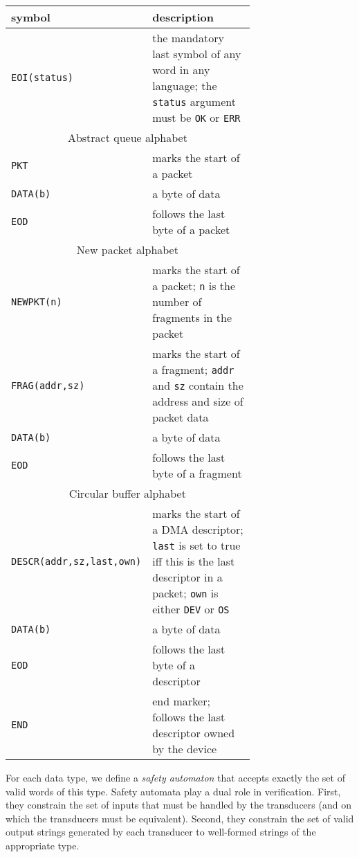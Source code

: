 \documentclass{article}
\begin{document}
\begin{table}
    \small
    \begin{tabular}{|l|p{0.7\linewidth}|}
        \hline
        symbol & description \\
        \hline\hline
        \texttt{EOI(status)}   & the mandatory last symbol of any word in any language; the
                                 \texttt{status} argument must be 
                                 \texttt{OK} or \texttt{ERR} \\
        \hline
        \multicolumn{2}{|c|}{Abstract queue alphabet}\\
        \hline
        \texttt{PKT}           & marks the start of a packet\\
        \texttt{DATA(b)}       & a byte of data\\
        \texttt{EOD}           & follows the last byte of a packet\\
        \hline
        \multicolumn{2}{|c|}{New packet alphabet}\\
        \hline
        \texttt{NEWPKT(n)}     & marks the start of a packet; \texttt{n} is the number of fragments in the packet\\
        \texttt{FRAG(addr,sz)} & marks the start of a fragment; \texttt{addr} and \texttt{sz} contain the address and size of packet data\\
        \texttt{DATA(b)}       & a byte of data\\
        \texttt{EOD}           & follows the last byte of a fragment\\
        \hline
        \multicolumn{2}{|c|}{Circular buffer alphabet}\\
        \hline
        \texttt{DESCR(addr,sz,last,own)} & marks the start of a DMA descriptor; \texttt{last} is set to true iff this is the last descriptor in a packet; \texttt{own} is either \texttt{DEV} or \texttt{OS}\\
        \texttt{DATA(b)}       & a byte of data\\
        \texttt{EOD}           & follows the last byte of a descriptor \\
        \texttt{END}           & end marker; follows the last descriptor owned by the device \\
        \hline
    \end{tabular}
    \label{t:alphabet}
\end{table}

For each data type, we define a \emph{safety automaton} that 
accepts exactly the set of valid words of this type.  Safety 
automata play a dual role in verification.  First, they constrain 
the set of inputs that must be handled by the transducers (and on 
which the transducers must be equivalent).  Second, they constrain 
the set of valid output strings generated by each transducer to 
well-formed strings of the appropriate type.
\end{document}
